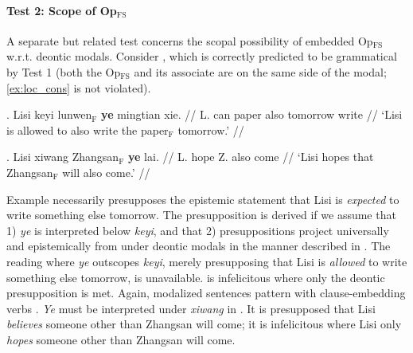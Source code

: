 \documentclass[11pt]{article}
\newcommand{\F}{\ensuremath{_{\mathrm{F}}}}
\newcommand{\opfs}{Op\(_{\mathrm{FS}}\)}
\begin{document}
\paragraph{Test 2: Scope of \opfs{}}

A separate but related test concerns the scopal possibility of embedded \opfs{} w.r.t. deontic modals.
Consider \Next, which is correctly predicted to be grammatical by Test 1 (both the \opfs{} and its associate are on the same side of the modal; \cref{ex:loc_cons} is not violated).
\begin{paracol}{2}
 \ex. \begingl
\gla Lisi keyi lunwen\F{} \textbf{ye} mingtian xie. //
  \glb L. can paper also tomorrow write //
  \glft `Lisi is allowed to also write the paper\F{} tomorrow.' //
\endgl

  \switchcolumn
 \ex. \begingl
  \gla Lisi xiwang Zhangsan\F{} \textbf{ye} lai. //
  \glb L. hope Z. also come //
  \glft `Lisi hopes that Zhangsan\F{} will also come.' //
\endgl

\end{paracol}
Example \LLast necessarily presupposes the epistemic statement that Lisi is \emph{expected} to write something else tomorrow.
The presupposition is derived if we assume that 1) \emph{ye} is interpreted below \emph{keyi}, and that 2) presuppositions project universally and epistemically from under deontic modals in the manner described in \citet{heimPresuppositionProjectionSemantics1992}.
The reading where \emph{ye} outscopes \emph{keyi}, merely presupposing that Lisi is \emph{allowed} to write something else tomorrow, is unavailable.
\LLast is infelicitous where only the deontic presupposition is met.
Again, modalized sentences pattern with clause-embedding verbs \Last.
%
\emph{Ye} must be interpreted under \emph{xiwang} in \Last.
It is presupposed that Lisi \emph{believes} someone other than Zhangsan will come; it is infelicitous where Lisi only \emph{hopes} someone other than Zhangsan will come.

\end{document}
